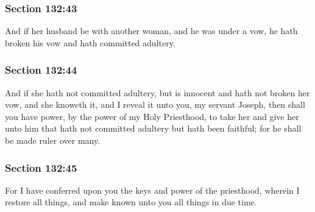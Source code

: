 	\subsubsection{Section 132:43} %
		\label{DC132-43}

		And if her husband be with another woman, and he was under a vow, he hath broken his vow and hath committed adultery.


	\subsubsection{Section 132:44} %
		\label{DC132-44}

		And if she hath not committed adultery, but is innocent and hath not broken her vow, and she knoweth it, and I reveal it unto you, my servant Joseph, then shall you have power, by the power of my Holy Priesthood, to take her and give her unto him that hath not committed adultery but hath been faithful; for he shall be made ruler over many.


	\subsubsection{Section 132:45} %
		\label{DC132-45}

		For I have conferred upon you the keys and power of the priesthood, wherein I restore all things, and make known unto you all things in due time.


